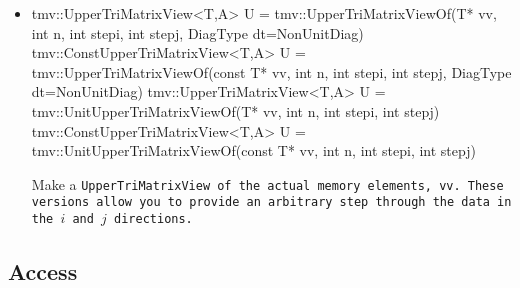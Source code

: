 \begin{itemize}
\item
\begin{tmvcode}
tmv::UpperTriMatrixView<T,A> U = 
      tmv::UpperTriMatrixViewOf(T* vv, int n, int stepi, int stepj, 
      DiagType dt=NonUnitDiag)
tmv::ConstUpperTriMatrixView<T,A> U = 
      tmv::UpperTriMatrixViewOf(const T* vv, int n, int stepi, 
      int stepj, DiagType dt=NonUnitDiag)
tmv::UpperTriMatrixView<T,A> U = 
      tmv::UnitUpperTriMatrixViewOf(T* vv, int n, int stepi, int stepj)
tmv::ConstUpperTriMatrixView<T,A> U = 
      tmv::UnitUpperTriMatrixViewOf(const T* vv, int n, int stepi, 
      int stepj)
\end{tmvcode}
Make a \tt{UpperTriMatrixView} of the actual memory elements, \tt{vv}.
These versions allow you to provide an arbitrary step through the data in 
the $i$ and $j$ directions. 
\end{itemize}

\subsection{Access}
\label{TriMatrix_Access}

